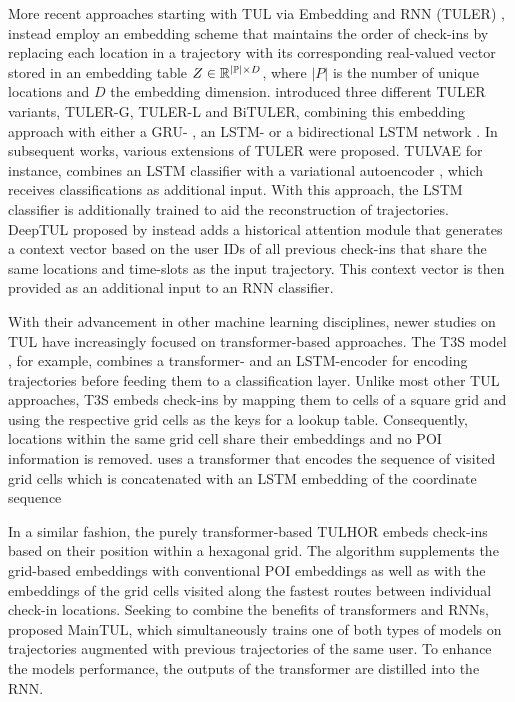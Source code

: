 \documentclass{article} %
\theoremstyle{definition}
\begin{document}
More recent approaches starting with TUL via Embedding and RNN (TULER) \citep{gaoIdentifyingHumanMobility2017}, instead employ an embedding scheme that maintains the order of check-ins by replacing each location in a trajectory with its corresponding real-valued vector stored in an embedding table $Z \in {\mathbb{R}}^{|{\mathbb{P}}| \times D}$, where $|P|$ is the number of unique locations and $D$ the embedding dimension.
\citet{gaoIdentifyingHumanMobility2017} introduced three different TULER variants, TULER-G, TULER-L and BiTULER, combining this embedding approach with either a GRU- \citep{choPropertiesNeuralMachine2014a}, an LSTM- or a bidirectional LSTM network \citep{hochreiterLongShort1997}.
In subsequent works, various extensions of TULER were proposed.
TULVAE \citep{zhouTrajectoryUserLinkingVariational2018} for instance, combines an LSTM classifier with a variational autoencoder \citep{kingmaAutoEncodingVariationalBayes2022a}, which receives classifications as additional input.
With this approach, the LSTM classifier is additionally trained to aid the reconstruction of trajectories.
DeepTUL proposed by \citet{miaoTrajectoryUserLinkingAttentive2020} instead adds a historical attention module that generates a context vector based on the user IDs of all previous check-ins that share the same locations and time-slots as the input trajectory.
This context vector is then provided as an additional input to an RNN classifier.

With their advancement in other machine learning disciplines, newer studies on TUL have increasingly focused on transformer-based approaches.
The T3S model \citep{yangT3SEffectiveRepresentation2021}, for example, combines a transformer- and an LSTM-encoder for encoding trajectories before feeding them to a classification layer.
Unlike most other TUL approaches, T3S embeds check-ins by mapping them to cells of a square grid and using the respective grid cells as the keys for a lookup table.
Consequently, locations within the same grid cell share their embeddings and no POI information is removed.
uses a transformer that encodes the sequence of visited grid cells which is concatenated with an LSTM embedding of the coordinate sequence

In a similar fashion, the purely transformer-based TULHOR \citep{alsaeedTrajectoryUserLinkingUsing2023a} embeds check-ins based on their position within a hexagonal grid.
The algorithm supplements the grid-based embeddings with conventional POI embeddings as well as with the embeddings of the grid cells visited along the fastest routes between individual check-in locations.
Seeking to combine the benefits of transformers and RNNs, \citet{chenMutualDistillationLearning2022a} proposed MainTUL, which simultaneously trains one of both types of models on trajectories augmented with previous trajectories of the same user.
To enhance the models performance, the outputs of the transformer are distilled into the RNN.
\end{document}
